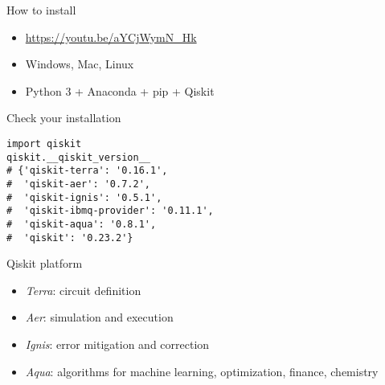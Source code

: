 \begin{frame}{How to install}
\begin{itemize}
    \item<1-> \url{https://youtu.be/aYCjWymN_Hk}
    \item<2-> Windows, Mac, Linux
    \item<3-> Python 3 + Anaconda + pip + Qiskit
\end{itemize}
\end{frame}


\begin{frame}[fragile]{Check your installation}
\begin{verbatim}
import qiskit
qiskit.__qiskit_version__
# {'qiskit-terra': '0.16.1',
#  'qiskit-aer': '0.7.2',
#  'qiskit-ignis': '0.5.1',
#  'qiskit-ibmq-provider': '0.11.1',
#  'qiskit-aqua': '0.8.1',
#  'qiskit': '0.23.2'}
\end{verbatim}
\end{frame}


\begin{frame}{Qiskit platform}
\begin{itemize}
    \item<1-> \emph{Terra}: circuit definition
    \item<2-> \emph{Aer}: simulation and execution
    \item<3-> \emph{Ignis}: error mitigation and correction
    \item<4-> \emph{Aqua}: algorithms for machine learning, optimization, finance, chemistry
\end{itemize}
\end{frame}

